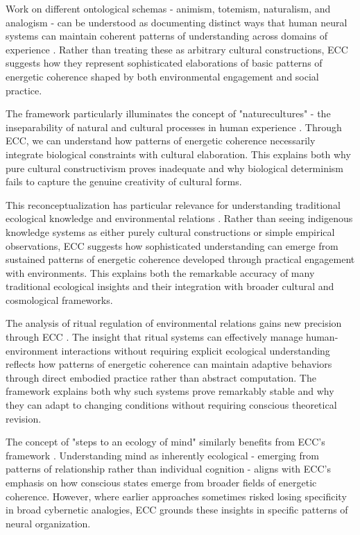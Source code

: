 \begin{refsection}
Work on different ontological schemas - animism, totemism, naturalism, and analogism - can be understood as documenting distinct ways that human neural systems can maintain coherent patterns of understanding across domains of experience \cite{descola2005beyond}. Rather than treating these as arbitrary cultural constructions, ECC suggests how they represent sophisticated elaborations of basic patterns of energetic coherence shaped by both environmental engagement and social practice.

The framework particularly illuminates the concept of "naturecultures" - the inseparability of natural and cultural processes in human experience \cite{haraway2003companion}. Through ECC, we can understand how patterns of energetic coherence necessarily integrate biological constraints with cultural elaboration. This explains both why pure cultural constructivism proves inadequate and why biological determinism fails to capture the genuine creativity of cultural forms.

This reconceptualization has particular relevance for understanding traditional ecological knowledge and environmental relations \cite{ingold2000perception}. Rather than seeing indigenous knowledge systems as either purely cultural constructions or simple empirical observations, ECC suggests how sophisticated understanding can emerge from sustained patterns of energetic coherence developed through practical engagement with environments. This explains both the remarkable accuracy of many traditional ecological insights and their integration with broader cultural and cosmological frameworks.

The analysis of ritual regulation of environmental relations gains new precision through ECC \cite{rappaport1999ritual}. The insight that ritual systems can effectively manage human-environment interactions without requiring explicit ecological understanding reflects how patterns of energetic coherence can maintain adaptive behaviors through direct embodied practice rather than abstract computation. The framework explains both why such systems prove remarkably stable and why they can adapt to changing conditions without requiring conscious theoretical revision.

The concept of "steps to an ecology of mind" similarly benefits from ECC's framework \cite{bateson1972steps}. Understanding mind as inherently ecological - emerging from patterns of relationship rather than individual cognition - aligns with ECC's emphasis on how conscious states emerge from broader fields of energetic coherence. However, where earlier approaches sometimes risked losing specificity in broad cybernetic analogies, ECC grounds these insights in specific patterns of neural organization.


\end{refsection}
